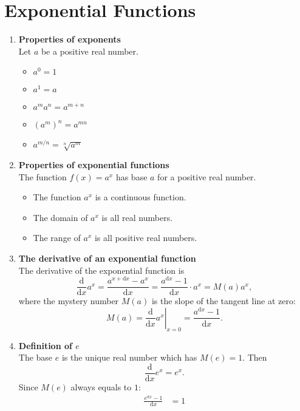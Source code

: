 \section{Exponential Functions}
\begin{enumerate}
    \item \textbf{Properties of exponents}\\
        Let \(a\) be a positive real number.
        \begin{itemize}
            \item \(a^0=1\)
            \item \(a^1=a\)
            \item \(a^m a^n=a^{m+n}\)
            \item \((a^m)^n=a^{mn}\)
            \item \(a^{m/n}=\sqrt[n]{a^m}\)
        \end{itemize}
    \item \textbf{Properties of exponential functions}\\
        \indent The function \(f(x)=a^x\) has base \(a\) for a positive real number.
        \begin{itemize}
            \item The function \(a^x\) is a continuous function.
            \item The domain of \(a^x\) is all real numbers.
            \item The range of \(a^x\) is all positive real numbers.
        \end{itemize}
    \item \textbf{The derivative of an exponential function}\\
        \indent The derivative of the exponential function is
        \[
            \frac{\mathrm{d}}{\mathrm{d}x}a^x=\frac{a^{x+\mathrm{d}x}-a^x}{\mathrm{d}x}=\frac{a^{\mathrm{d}x}-1}{\mathrm{d}x}\cdot a^x=M(a)a^x,
        \]
        where the mystery number \(M(a)\) is the slope of the tangent line at zero:
        \[
            M(a)=\left.\frac{\mathrm{d}}{\mathrm{d}x}a^x\right|_{x=0}=\frac{a^{\mathrm{d}x}-1}{\mathrm{d}x}.
        \]
    \item \textbf{Definition of \(e\)}\\
        \indent The base \(e\) is the unique real number which has \(M(e)=1\). Then
        \[
            \frac{\mathrm{d}}{\mathrm{d}x}e^x=e^x.
        \]
        Since \(M(e)\) always equals to \(1\):
        \begin{align*}
            \frac{e^{\mathrm{d}x} -1}{\mathrm{d}x} & =1\\

\end{align*}
\end{enumerate}
